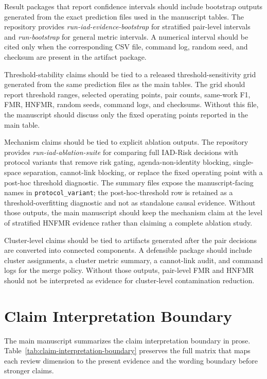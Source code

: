 \documentclass[11pt]{article}
\begin{document}
Result packages that report confidence intervals should include bootstrap outputs generated from the exact prediction files used in the manuscript tables. The repository provides \emph{run-iad-evidence-bootstrap} for stratified pair-level intervals and \emph{run-bootstrap} for general metric intervals. A numerical interval should be cited only when the corresponding CSV file, command log, random seed, and checksum are present in the artifact package.

Threshold-stability claims should be tied to a released threshold-sensitivity grid generated from the same prediction files as the main tables. The grid should report threshold ranges, selected operating points, pair counts, same-work F1, FMR, HNFMR, random seeds, command logs, and checksums. Without this file, the manuscript should discuss only the fixed operating points reported in the main table.

Mechanism claims should be tied to explicit ablation outputs. The repository provides \emph{run-iad-ablation-suite} for comparing full IAD-Risk decisions with protocol variants that remove risk gating, agenda-non-identity blocking, single-space separation, cannot-link blocking, or replace the fixed operating point with a post-hoc threshold diagnostic. The summary files expose the manuscript-facing names in \texttt{protocol\_variant}; the post-hoc-threshold row is retained as a threshold-overfitting diagnostic and not as standalone causal evidence. Without those outputs, the main manuscript should keep the mechanism claim at the level of stratified HNFMR evidence rather than claiming a complete ablation study.

Cluster-level claims should be tied to artifacts generated after the pair decisions are converted into connected components. A defensible package should include cluster assignments, a cluster metric summary, a cannot-link audit, and command logs for the merge policy. Without those outputs, pair-level FMR and HNFMR should not be interpreted as evidence for cluster-level contamination reduction.

\section{Claim Interpretation Boundary}

The main manuscript summarizes the claim interpretation boundary in prose. Table~\ref{tab:claim-interpretation-boundary} preserves the full matrix that maps each review dimension to the present evidence and the wording boundary before stronger claims.
\end{document}

